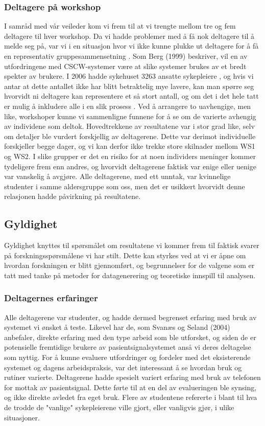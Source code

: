 \subsubsection{Deltagere på workshop}
I samråd med vår veileder kom vi frem til at vi trengte mellom tre og fem deltagere til hver workshop. Da vi hadde problemer med å få nok deltagere til å melde seg på, var vi i en situasjon hvor vi ikke kunne plukke ut deltagere for å få en representativ gruppesammensetning \cite{Seland, Cavaye95}. Som Berg (1999) beskriver, vil en av utfordringene med CSCW-systemer være at slike systemer brukes av et bredt spekter av brukere. I 2006 hadde sykehuset 3263 ansatte sykepleiere \cite{nokkeltall}, og hvis vi antar at dette antallet ikke har blitt betraktelig mye lavere, kan man spørre seg hvorvidt ni deltagere kan representere et så stort antall, og om det i det hele tatt er mulig å inkludere alle i en slik prosess \cite{Cavaye95}. Ved å arrangere to uavhengige, men like, workshoper kunne vi sammenligne funnene for å se om de varierte avhengig av individene som deltok. Hovedtrekkene av resultatene var i stor grad like, selv om detaljer ble vurdert forskjellig av deltagerene. Dette var derimot individuelle forskjeller begge dager, og vi kan derfor ikke trekke store skilnader mellom WS1 og WS2. I slike grupper er det en risiko for at noen individers meninger kommer tydeligere frem enn andres, og hvorvidt deltagerene faktisk var enige eller uenige var vanskelig å avgjøre. Alle deltagerene, med ett unntak, var kvinnelige studenter i samme aldersgruppe som oss, men det er usikkert hvorvidt denne relasjonen hadde påvirkning på resultatene.

\subsection{Gyldighet}
Gyldighet knyttes til spørsmålet om resultatene vi kommer frem til faktisk svarer på forskningsspørsmålene vi har stilt. Dette kan styrkes ved at vi er åpne om hvordan forskningen er blitt gjennomført, og begrunnelser for de valgene som er tatt med tanke på metoder for datagenerering og teoretiske innspill til analysen. 

\subsubsection{Deltagernes erfaringer}
Alle deltagerene var studenter, og hadde dermed begrenset erfaring med bruk av systemet vi ønsket å teste. Likevel har de, som Svanæs og Seland (2004) anbefaler, direkte erfaring med den type arbeid som ble utforsket, og siden de er potensielle fremtidige brukere av pasientsignalsystemet anså vi deres deltagelse som nyttig. For å kunne evaluere utfordringer og fordeler med det eksisterende systemet og dagens arbeidspraksis, var det interessant å se hvordan bruk og rutiner varierte. Deltagerene hadde spesielt variert erfaring med bruk av telefonen for mottak av pasientsignal. Dette førte til at en del av evalueringen ble synsing, og ikke direkte avledet fra eget bruk. Flere av studentene refererte i blant til hva de trodde de "vanlige" sykepleierene ville gjort, eller vanligvis gjør, i ulike situasjoner. 

